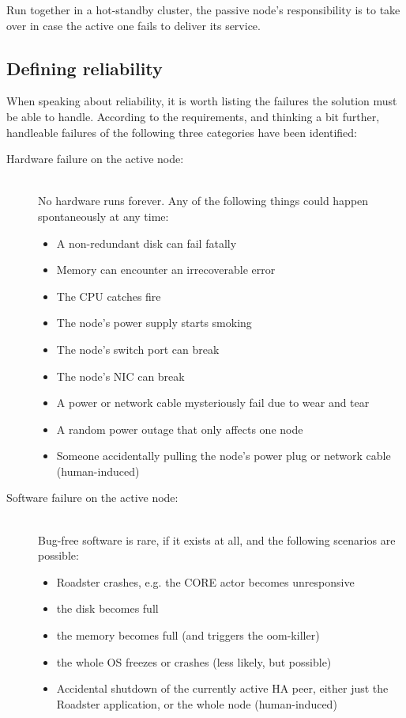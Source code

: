 Run together in a hot-standby cluster, the passive node's responsibility is to
take over in case the active one fails to deliver its service.



\subsection{Defining reliability}
When speaking about reliability, it is worth listing the failures the solution must be
able to handle. According to the requirements, and thinking a bit further,
handleable failures of the following three categories have been identified:

\begin{description}
	\item [Hardware failure on the active node:] \hfill\\
		No hardware runs forever. Any of the following things could
		happen spontaneously at any time:

		\begin{itemize}
			\item A non-redundant disk can fail fatally
			\item Memory can encounter an irrecoverable error
			\item The \gls{CPU} catches fire
			\item The node's power supply starts smoking
			\item The node's switch port can break
			\item The node's \gls{NIC} can break
			\item A power or network cable mysteriously fail due to wear and tear
			\item A random power outage that only affects one node
			\item Someone accidentally pulling the node's power
				plug or network cable (human-induced)
		\end{itemize}

	\item [Software failure on the active node:] \hfill\\
		Bug-free software is rare, if it exists at all, and the
		following scenarios are possible:

		\begin{itemize}
			\item Roadster crashes, e.g. the CORE actor becomes unresponsive
			\item the disk becomes full
			\item the memory becomes full (and triggers the \gls{oom-killer})
			\item the whole OS freezes or crashes (less likely, but possible)
			\item Accidental shutdown of the currently active HA
				peer, either just the Roadster application, or
				the whole node (human-induced)
		\end{itemize}


\end{description}
